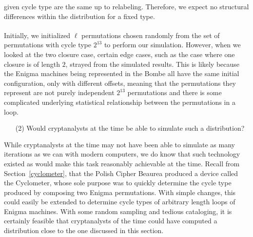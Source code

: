 given cycle type are the same up to relabeling. Therefore, we expect
no structural differences within the distribution for a fixed type.
\\\\Initially, we initialized $\ell$ permutations chosen randomly
from the set of permutations with cycle type $2^{13}$ to perform our
simulation. However, when we looked at the two closure case, certain
edge cases, such as the case where one closure is of length $2$,
strayed from the simulated results. This is likely because the Enigma
machines being represented in the Bombe all have the same initial
configuration, only with different offsets, meaning that the
permutations they represent are not purely independent $2^{13}$
permutations and there is some complicated underlying statistical
relationship between the permutations in a loop.
\begin{enumerate}
  \item[(2)]Would cryptanalysts at the time be able to simulate such
    a distribution?
\end{enumerate}
While cryptanalysts at the time may not have been able to simulate as
many iterations as we can with modern computers, we do know that such
technology existed as would make this task reasonably achievable at
the time. Recall from Section~\ref{cyclometer}, that the Polish
Cipher Beaurea produced a device called the Cyclometer, whose sole
purpose was to quickly determine the cycle type produced by composing
two Enigma permutations. With simple changes, this could easily be
extended to determine cycle types of arbitrary length loops of Enigma
machines. With some random sampling and tedious cataloging, it is
certainly feasible that cryptanalysts of the time could have computed
a distribution close to the one discussed in this section.
